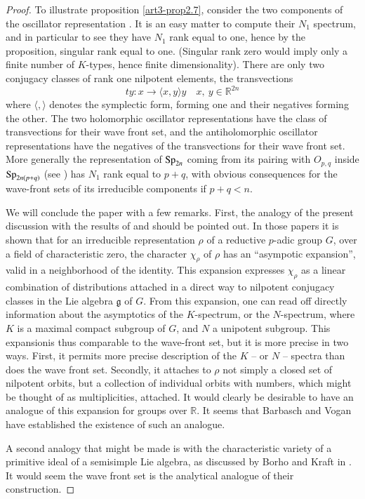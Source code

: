 \begin{proof}
To illustrate proposition \ref{art3-prop2.7}, consider the two components of the oscillator representation \cite{art3-H3}. It is an easy matter to compute their $N_{1}$ spectrum, and in particular to see they have $N_{1}$ rank equal to one, hence by the proposition, singular rank equal to one. (Singular rank zero would imply only a finite number of $K$-types, hence finite dimensionality). There are only two conjugacy classes of rank one nilpotent elements, the transvections
$$
ty:x\to \langle x,y\rangle y\quad x, \ y\in \mathbb{R}^{2n}
$$
where $\langle,\rangle$ denotes the symplectic form, forming one and their negatives forming the other. The two holomorphic oscillator representations have the class of transvections for their wave front set, and the antiholomorphic oscillator representations have the negatives of the transvections for their wave front set. More generally the representation of $\operatorname{Sp}_{2n}$ coming from its pairing with $O_{p,q}$ inside $\operatorname{Sp}_{2n(p+q)}$ (see \cite{art3-H3}) has $N_{1}$ rank equal to $p+q$, with obvious consequences for the wave-front sets of its irreducible components if $p+q<n$.

We will conclude the paper with a few remarks. First, the analogy of the present discussion with the results of \cite{art3-H4} and \cite{art3-HC} should be pointed out. In those papers it is shown that for an irreducible representation $\rho$ of a reductive $p$-adic group $G$, over a field of characteristic zero, the character $\chi_{\rho}$ of $\rho$ has an ``asympotic expansion'', valid in a neighborhood of the identity. This expansion expresses $\chi_{\rho}$ as a linear combination of distributions attached in a direct way to nilpotent conjugacy classes in the Lie algebra $\mathfrak{g}$ of $G$. From this expansion, one can read off directly information about the asymptotics of the $K$-spectrum, or the $N$-spectrum, where $K$ is a maximal compact subgroup of $G$, and $N$ a unipotent subgroup. This expansion\pageoriginale is thus comparable to the wave-front set, but it is more precise in two ways. First, it permits more precise description of the $K$ -- or $N$ -- spectra than does the wave front set. Secondly, it attaches to $\rho$ not simply a closed set of nilpotent orbits, but a collection of individual orbits with numbers, which might be thought of as multiplicities, attached. It would clearly be desirable to have an analogue of this expansion for groups over $\mathbb{R}$. It seems that Barbasch and Vogan \cite{art3-BV} have established the existence of such an analogue.

A second analogy that might be made is with the characteristic variety of a primitive ideal of a semisimple Lie algebra, as discussed by Borho and Kraft in \cite{art3-BK}. It would seem the wave front set is the analytical analogue of their construction.  
\end{proof}

